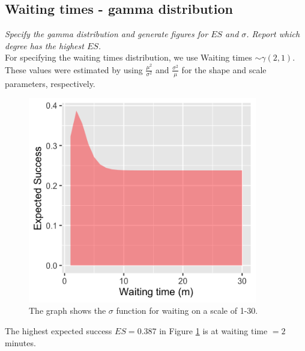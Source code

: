 \documentclass[11pt,a4paper,oneside]{article}
\begin{document}
\subsection{Waiting times - gamma distribution}
\textit{Specify the gamma distribution and generate figures for $ES$ and $\sigma$. Report which degree has the highest $ES$.}\\

For specifying the waiting times distribution, we use Waiting times $\sim \mathcal{\gamma}(2, 1)$. These values were estimated by using $\frac{\mu^2}{\sigma^2}$ and $\frac{\sigma^2}{\mu}$ for the shape and scale parameters, respectively. 

\begin{figure}[H]
    \centering
    \includegraphics[width=100mm]{figs/Question_2_waiting_time_es.png}
    \caption{The graph shows the $\sigma$ function for waiting on a scale of 1-30.}
  \label{fig:q2_waiting_es}
\end{figure}

The highest expected success $ES = 0.387$ in Figure \ref{fig:q2_waiting_es} is at waiting time $= 2$ minutes.
\end{document}
